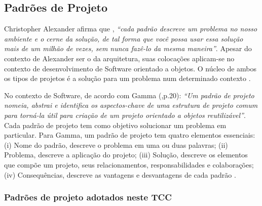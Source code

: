 \subsection{Padrões de Projeto}

Christopher Alexander afirma que , \textit{“cada padrão descreve um problema no nosso ambiente e o cerne da solução, de tal forma que você possa usar essa solução mais de um milhão de vezes, sem nunca fazê-lo da mesma maneira”}. Apesar do contexto de Alexander ser o da arquitetura, suas colocações aplicam-se no contexto de desenvolvimento de Software orientado a objetos. O núcleo de ambos os tipos de projetos é a solução para um problema num determinado contexto \cite[p.19]{gamma2000}.

No contexto de Software, de acordo com Gamma (\citeyear{gamma2000},p.20): \textit{“Um padrão de projeto nomeia, abstrai e identifica os aspectos-chave de uma estrutura de projeto comum para torná-la útil para criação de um projeto orientado a objetos reutilizável”}. Cada padrão de projeto tem como objetivo solucionar um problema em particular. Para Gamma, um padrão de projeto tem quatro elementos essenciais: (i) Nome do padrão, descreve o problema em uma ou duas palavras; (ii) Problema, descreve a aplicação do projeto; (iii) Solução, descreve os elementos que compõe um projeto, seus relacionamentos, responsabilidades e colaborações; (iv) Consequências, descreve as vantagens e desvantagens de cada padrão \cite[p.19]{gamma2000}.

\subsubsection{Padrões de projeto adotados neste TCC}

